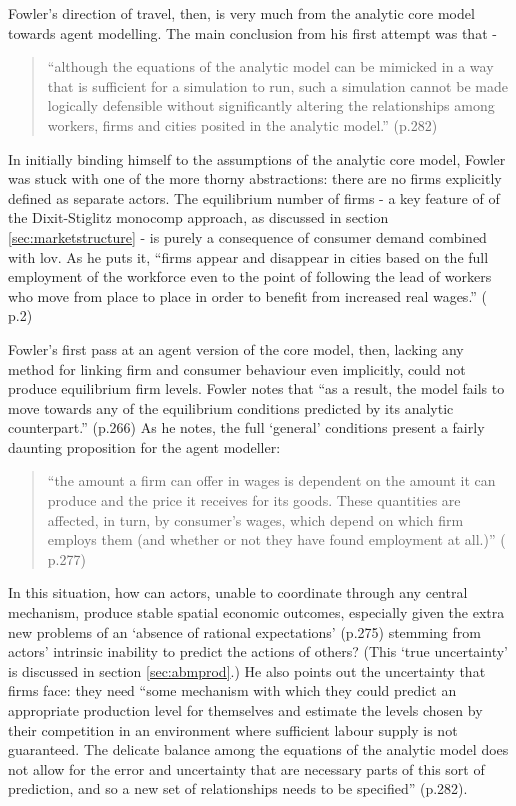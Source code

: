 Fowler's direction of travel, then, is very much from the analytic core model towards agent modelling. The main conclusion from his first attempt was that -

\begin{quote}
``although the equations of the analytic model can be mimicked in a way that is sufficient for a simulation to run, such a simulation cannot be made logically defensible without significantly altering the relationships among workers, firms and cities posited in the analytic model.'' (p.282)
\end{quote}

In initially binding himself to the assumptions of the analytic core model, Fowler was stuck with one of the more thorny abstractions: there are no firms explicitly defined as separate actors. The equilibrium number of firms - a key feature of of the Dixit-Stiglitz \gls{monocomp} approach, as discussed in section \ref{sec:marketstructure} - is purely a consequence of consumer demand combined with \gls{lov}. As he puts it, ``firms appear and disappear in cities based on the full employment of the workforce even to the point of following the lead of workers who move from place to place in order to benefit from increased real wages.'' (\citealt{fowler_finding_2011} p.2) 

Fowler's first pass at an agent version of the core model, then, lacking any method for linking firm and consumer behaviour even implicitly, could not produce equilibrium firm levels. Fowler notes that ``as a result, the model fails to move towards any of the equilibrium conditions predicted by its analytic counterpart.'' (p.266) As he notes, the full `general' conditions present a fairly daunting proposition for the agent modeller: 

\begin{quote}
``the amount a firm can offer in wages is dependent on the amount it can produce and the price it receives for its goods. These quantities are affected, in turn, by consumer's wages, which depend on which firm employs them (and whether or not they have found employment at all.)'' (\citealt{fowler_taking_2007} p.277) 
\end{quote}

In this situation, how can actors, unable to coordinate through any central mechanism, produce stable spatial economic outcomes, especially given the extra new problems of an `absence of rational expectations' (p.275) stemming from actors' intrinsic inability to predict the actions of others? (This `true uncertainty' is discussed in section \ref{sec:abmprod}.) He also points out the uncertainty that firms face: they need ``some mechanism with which they could predict an appropriate production level for themselves and estimate the levels chosen by their competition in an environment where sufficient labour supply is not guaranteed. The delicate balance among the equations of the analytic model does not allow for the error and uncertainty that are necessary parts of this sort of prediction, and so a new set of relationships needs to be specified'' (p.282). 

